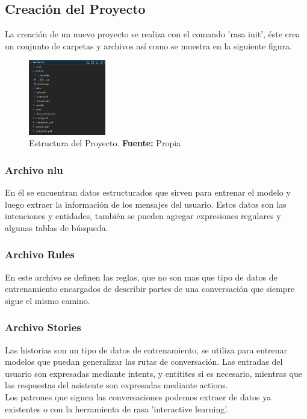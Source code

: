 \subsection{Creación del Proyecto}
La creación de un nuevo proyecto se realiza con el comando ’rasa init’, éste crea
un conjunto de carpetas y archivos así como se muestra en la siguiente figura.
\begin{figure}[H]
\begin{centering}
\includegraphics[angle=0,width=0.3\textwidth]{Figuras/4_Estructura del Proyecto.png}
\par \end{centering}
\caption[Estructura del Proyecto]{Estructura del Proyecto. \textbf{Fuente:} Propia}
\label{Estructura}
\end{figure}
\subsubsection{Archivo nlu}
En él se encuentran datos estructurados que sirven para entrenar el modelo y luego extraer la información de los mensajes del usuario. Estos datos son  las intenciones y entidades, también se pueden agregar expresiones regulares y algunas tablas de búsqueda. \cite{NLU_Documentation}
\subsubsection{Archivo Rules}
En este archivo se definen las reglas, que no son mas que  tipo de datos de entrenamiento encargados de describir partes de una conversación que siempre sigue el mismo camino.\cite{Rules_Documentation}
\subsubsection{Archivo Stories}
Las historias son un tipo de datos de entrenamiento, se utiliza para entrenar modelos que puedan generalizar las rutas de conversación. Las entradas del usuario son expresadas mediante intents, y entitites si es necesario,  mientras que las respuestas del asistente son expresadas mediante actions.\\
Los patrones que siguen las conversaciones podemos extraer de datos ya existentes o con la herramienta de rasa 'interactive learning'. \cite{Stories_Documentation}
